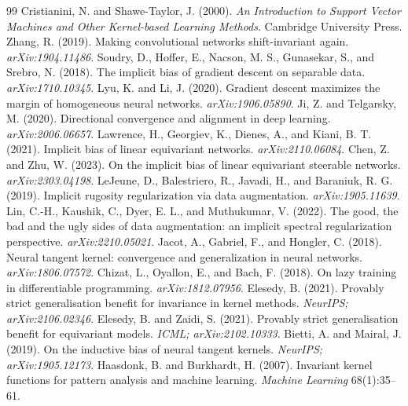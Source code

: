 \documentclass[11pt]{article}
\theoremstyle{plain}
\theoremstyle{definition}
\theoremstyle{remark}
\begin{document}
\begin{thebibliography}{99}
 Cristianini, N. and Shawe-Taylor, J. (2000). \emph{An Introduction to Support Vector Machines and Other Kernel-based Learning Methods}. Cambridge University Press.
 Zhang, R. (2019). Making convolutional networks shift-invariant again. \emph{arXiv:1904.11486}.
 Soudry, D., Hoffer, E., Nacson, M. S., Gunasekar, S., and Srebro, N. (2018). The implicit bias of gradient descent on separable data. \emph{arXiv:1710.10345}.
 Lyu, K. and Li, J. (2020). Gradient descent maximizes the margin of homogeneous neural networks. \emph{arXiv:1906.05890}.
 Ji, Z. and Telgarsky, M. (2020). Directional convergence and alignment in deep learning. \emph{arXiv:2006.06657}.
 Lawrence, H., Georgiev, K., Dienes, A., and Kiani, B. T. (2021). Implicit bias of linear equivariant networks. \emph{arXiv:2110.06084}.
 Chen, Z. and Zhu, W. (2023). On the implicit bias of linear equivariant steerable networks. \emph{arXiv:2303.04198}.
 LeJeune, D., Balestriero, R., Javadi, H., and Baraniuk, R. G. (2019). Implicit rugosity regularization via data augmentation. \emph{arXiv:1905.11639}.
 Lin, C.-H., Kaushik, C., Dyer, E. L., and Muthukumar, V. (2022). The good, the bad and the ugly sides of data augmentation: an implicit spectral regularization perspective. \emph{arXiv:2210.05021}.
 Jacot, A., Gabriel, F., and Hongler, C. (2018). Neural tangent kernel: convergence and generalization in neural networks. \emph{arXiv:1806.07572}.
 Chizat, L., Oyallon, E., and Bach, F. (2018). On lazy training in differentiable programming. \emph{arXiv:1812.07956}.
 Elesedy, B. (2021). Provably strict generalisation benefit for invariance in kernel methods. \emph{NeurIPS; arXiv:2106.02346}.
 Elesedy, B. and Zaidi, S. (2021). Provably strict generalisation benefit for equivariant models. \emph{ICML; arXiv:2102.10333}.
 Bietti, A. and Mairal, J. (2019). On the inductive bias of neural tangent kernels. \emph{NeurIPS; arXiv:1905.12173}.
 Haasdonk, B. and Burkhardt, H. (2007). Invariant kernel functions for pattern analysis and machine learning. \emph{Machine Learning} 68(1):35--61.

\end{thebibliography}
\end{document}
